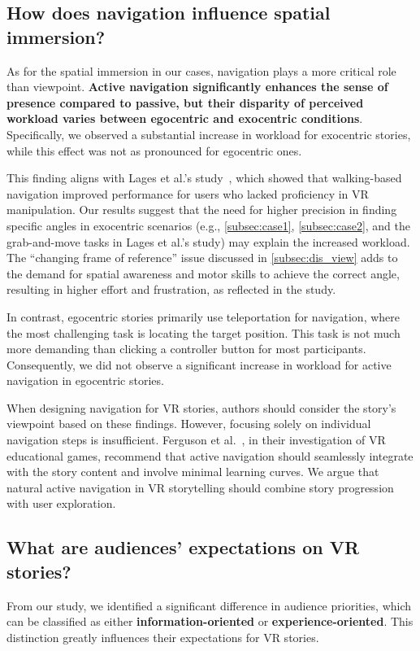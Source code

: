 \subsection{How does navigation influence spatial immersion?}
As for the spatial immersion in our cases, navigation plays a more critical role than viewpoint. \textbf{Active navigation significantly enhances the sense of presence compared to passive, but their disparity of perceived workload varies between egocentric and exocentric conditions}. Specifically, we observed a substantial increase in workload for exocentric stories, while this effect was not as pronounced for egocentric ones.

This finding aligns with Lages et al.'s study~\cite{lages2018move}, which showed that walking-based navigation improved performance for users who lacked proficiency in VR manipulation. Our results suggest that the need for higher precision in finding specific angles in exocentric scenarios (e.g., \autoref{subsec:case1}, \autoref{subsec:case2}, and the grab-and-move tasks in Lages et al.'s study) may explain the increased workload. The ``changing frame of reference'' issue discussed in \autoref{subsec:dis_view} adds to the demand for spatial awareness and motor skills to achieve the correct angle, resulting in higher effort and frustration, as reflected in the study.

In contrast, egocentric stories primarily use teleportation for navigation, where the most challenging task is locating the target position. This task is not much more demanding than clicking a controller button for most participants. Consequently, we did not observe a significant increase in workload for active navigation in egocentric stories.

When designing navigation for VR stories, authors should consider the story's viewpoint based on these findings. However, focusing solely on individual navigation steps is insufficient. Ferguson et al.~\cite{ferguson2020role}, in their investigation of VR educational games, recommend that active navigation should seamlessly integrate with the story content and involve minimal learning curves. We argue that natural active navigation in VR storytelling should combine story progression with user exploration.

\subsection{What are audiences' expectations on VR stories?}
From our study, we identified a significant difference in audience priorities, which can be classified as either \textbf{information-oriented} or \textbf{experience-oriented}. This distinction greatly influences their expectations for VR stories.


